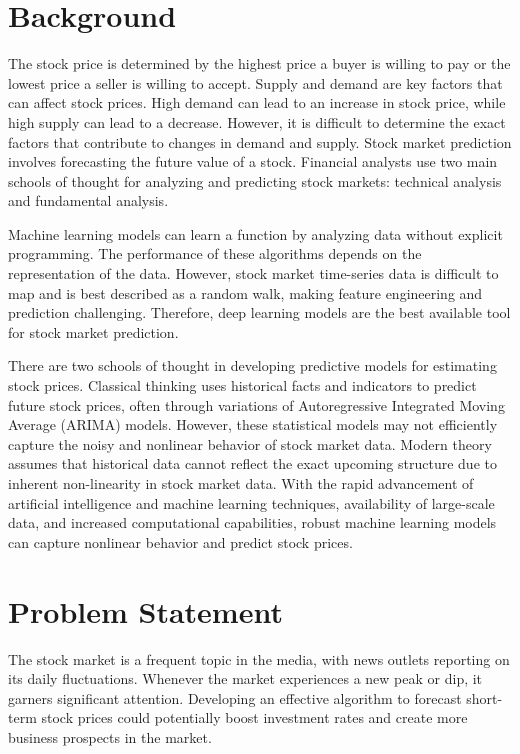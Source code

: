 \section{Background}\label{sec:bkgrnd}%
\vspace{-18pt}
The stock price is determined by the highest price a buyer is willing to pay or the lowest price a seller is willing to accept. Supply and demand are key factors that can affect stock prices. High demand can lead to an increase in stock price, while high supply can lead to a decrease. However, it is difficult to determine the exact factors that contribute to changes in demand and supply. Stock market prediction involves forecasting the future value of a stock. Financial analysts use two main schools of thought for analyzing and predicting stock markets: technical analysis and fundamental analysis. \cite{saud2020analysis}%
\par
 Machine learning models can learn a function by analyzing data without explicit programming. The performance of these algorithms depends on the representation of the data. However, stock market time-series data is difficult to map and is best described as a random walk, making feature engineering and prediction challenging. Therefore, deep learning models are the best available tool for stock market prediction.\cite{saud2019analysis}%
 \par
 There are two schools of thought in developing predictive models for estimating stock prices. Classical thinking uses historical facts and indicators to predict future stock prices, often through variations of Autoregressive Integrated Moving Average (ARIMA) models. However, these statistical models may not efficiently capture the noisy and nonlinear behavior of stock market data. Modern theory assumes that historical data cannot reflect the exact upcoming structure due to inherent non-linearity in stock market data. With the rapid advancement of artificial intelligence and machine learning techniques, availability of large-scale data, and increased computational capabilities, robust machine learning models can capture nonlinear behavior and predict stock prices.\cite{pokhrel2022predicting}%

\section{Problem Statement}
\vspace{-18pt}
The stock market is a frequent topic in the media, with news outlets reporting on its daily fluctuations. Whenever the market experiences a new peak or dip, it garners significant attention. Developing an effective algorithm to forecast short-term stock prices could potentially boost investment rates and create more business prospects in the market.

